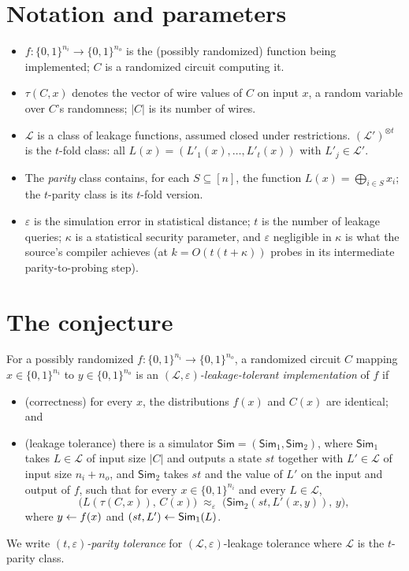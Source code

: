\documentclass{aicr-conjecture}
\newcommand{\bits}{\{0,1\}}
\newcommand{\eps}{\varepsilon}
\newcommand{\Lc}{\mathcal{L}}
\newcommand{\Sim}{\mathsf{Sim}}
\begin{document}
\section{Notation and parameters}\label{sec:notation}

\begin{itemize}[nosep]
  \item $f : \bits^{n_{i}} \to \bits^{n_{o}}$ is the (possibly
    randomized) function being implemented; $C$ is a randomized circuit
    computing it.
  \item $\tau(C, x)$ denotes the vector of wire values of $C$ on input
    $x$, a random variable over $C$'s randomness; $|C|$ is its number of
    wires.
  \item $\Lc$ is a class of leakage functions, assumed closed under
    restrictions. $(\Lc')^{\otimes t}$ is the $t$-fold class: all $L(x)
    = (L'_{1}(x), \dots, L'_{t}(x))$ with $L'_{j} \in \Lc'$.
  \item The \emph{parity} class contains, for each $S \subseteq [n]$,
    the function $L(x) = \bigoplus_{i \in S} x_{i}$; the $t$-parity
    class is its $t$-fold version.
  \item $\eps$ is the simulation error in statistical distance; $t$ is
    the number of leakage queries; $\kappa$ is a statistical security
    parameter, and $\eps$ negligible in $\kappa$ is what the source's
    compiler achieves (at $k = O(t(t+\kappa))$ probes in its intermediate
    parity-to-probing step).
\end{itemize}

\section{The conjecture}\label{sec:conjectures}

\begin{definition}\label{def:ltc}
For a possibly randomized $f : \bits^{n_{i}} \to \bits^{n_{o}}$, a
randomized circuit $C$ mapping $x \in \bits^{n_{i}}$ to $y \in
\bits^{n_{o}}$ is an \emph{$(\Lc, \eps)$-leakage-tolerant
implementation} of $f$ if
\begin{itemize}[nosep]
  \item (correctness) for every $x$, the distributions $f(x)$ and $C(x)$
    are identical; and
  \item (leakage tolerance) there is a simulator $\Sim = (\Sim_{1},
    \Sim_{2})$, where $\Sim_{1}$ takes $L \in \Lc$ of input size $|C|$
    and outputs a state $st$ together with $L' \in \Lc$ of input size
    $n_{i} + n_{o}$, and $\Sim_{2}$ takes $st$ and the value of $L'$ on
    the input and output of $f$, such that for every $x \in
    \bits^{n_{i}}$ and every $L \in \Lc$,
    \[
      \bigl( L(\tau(C,x)),\, C(x) \bigr) \;\approx_{\eps}\;
      \bigl( \Sim_{2}(st, L'(x,y)),\, y \bigr),
    \]
    where $y \leftarrow f(x)$ and $(st, L') \sample \Sim_{1}(L)$.
\end{itemize}
We write \emph{$(t,\eps)$-parity tolerance} for $(\Lc,\eps)$-leakage
tolerance where $\Lc$ is the $t$-parity class.
\end{definition}
\end{document}
